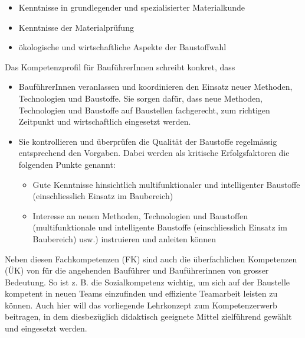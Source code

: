 \documentclass[
11pt,
captions=tableheading,
smallheadings,
headsepline,
footsepline, 
parskip=half-,
]{scrartcl}
\begin{document}
\begin{itemize}
    \item Kenntnisse in grundlegender und spezialisierter Materialkunde
    \item Kenntnisse der Materialprüfung 
    \item  ökologische und wirtschaftliche Aspekte der Baustoffwahl
\end{itemize}


Das Kompetenzprofil für BauführerInnen schreibt konkret, dass
\begin{itemize}
    \item BauführerInnen veranlassen und koordinieren den Einsatz neuer Methoden, Technologien und Baustoffe. Sie sorgen dafür, dass neue Methoden, Technologien und Baustoffe auf Baustellen fachgerecht, zum richtigen Zeitpunkt und wirtschaftlich eingesetzt werden.
    \item Sie kontrollieren und überprüfen die Qualität der Baustoffe regelmässig entsprechend den Vorgaben. Dabei werden als kritische Erfolgsfaktoren die folgenden Punkte genannt:
    \begin{itemize}
        \item Gute Kenntnisse hinsichtlich multifunktionaler und intelligenter Baustoffe (einschliesslich Einsatz im Baubereich)
        \item Interesse an neuen Methoden, Technologien und Baustoffen (multifunktionale und intelligente Baustoffe (einschliesslich Einsatz im Baubereich) usw.) instruieren und anleiten können
    \end{itemize}
\end{itemize}

Neben diesen Fachkompetenzen (FK) sind auch die überfachlichen Kompetenzen (ÜK) von für die angehenden Bauführer und Bauführerinnen von grosser Bedeutung. So ist z. B. die Sozialkompetenz wichtig, um sich auf der Baustelle kompetent in neuen Teams einzufinden und effiziente Teamarbeit leisten zu können. Auch hier will das vorliegende Lehrkonzept zum Kompetenzerwerb beitragen, in dem diesbezüglich didaktisch geeignete Mittel zielführend gewählt und eingesetzt werden. 
\end{document}
